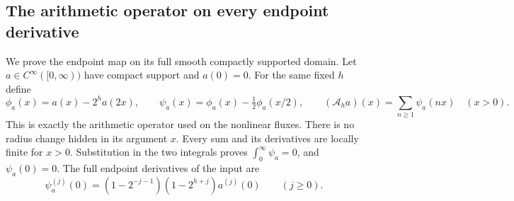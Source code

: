 \subsection{The arithmetic operator on every endpoint derivative}

We prove the endpoint map on its full smooth compactly supported
domain. Let \(a\in C^\infty([0,\infty))\) have compact support and
\(a(0)=0\). For the same fixed \(h\) define
\[
 \phi_a(x)=a(x)-2^h a(2x),\qquad
 \psi_a(x)=\phi_a(x)-\tfrac12\phi_a(x/2),\qquad
 (\mathcal A_h a)(x)=\sum_{n\ge1}\psi_a(nx)\quad(x>0).
\]
This is exactly the arithmetic operator used on the nonlinear fluxes.
There is no radius change hidden in its argument \(x\).
Every sum and its derivatives are locally finite for \(x>0\).
Substitution in the two integrals proves
\(\int_0^\infty\psi_a=0\), and \(\psi_a(0)=0\).
The full endpoint derivatives of the input are
\begin{equation}\label{naj:psi-jet}
 \psi_a^{(j)}(0)
  =(1-2^{-j-1})(1-2^{h+j})a^{(j)}(0)\qquad(j\ge0).
\end{equation}

